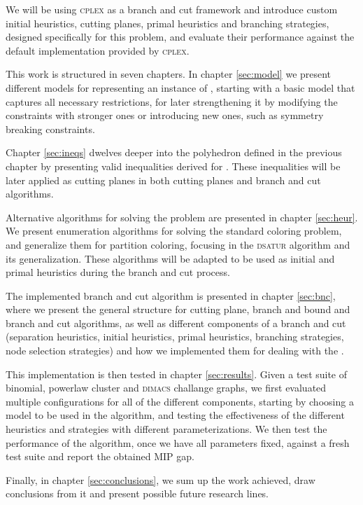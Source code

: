 We will be using \textsc{cplex} as a branch and cut framework and introduce custom initial heuristics, cutting planes, primal heuristics and branching strategies, designed specifically for this problem, and evaluate their performance against the default implementation provided by \textsc{cplex}.

This work is structured in seven chapters. In chapter \ref{sec:model} we present different models for representing an instance of \PCP{}, starting with a basic model that captures all necessary restrictions, for later strengthening it by modifying the constraints with stronger ones or introducing new ones, such as symmetry breaking constraints.

Chapter \ref{sec:ineqs} dwelves deeper into the polyhedron defined in the previous chapter by presenting valid inequalities derived for \PCP{}. These inequalities will be later applied as cutting planes in both cutting planes and branch and cut algorithms.

Alternative algorithms for solving the problem are presented in chapter \ref{sec:heur}. We present enumeration algorithms for solving the standard coloring problem, and generalize them for partition coloring, focusing in the \textsc{dsatur} algorithm \cite{brelaz1979new} and its generalization. These algorithms will be adapted to be used as initial and primal heuristics during the branch and cut process.

The implemented branch and cut algorithm is presented in chapter \ref{sec:bnc}, where we present the general structure for cutting plane, branch and bound and branch and cut algorithms, as well as different components of a branch and cut (separation heuristics, initial heuristics, primal heuristics, branching strategies, node selection strategies) and how we implemented them for dealing with the \PCP{}.

This implementation is then tested in chapter \ref{sec:results}. Given a test suite of binomial, powerlaw cluster and \textsc{dimacs} challange graphs, we first evaluated multiple configurations for all of the different components, starting by choosing a model to be used in the algorithm, and testing the effectiveness of the different heuristics and strategies with different parameterizations. We then test the performance of the algorithm, once we have all parameters fixed, against a fresh test suite and report the obtained MIP gap.

Finally, in chapter \ref{sec:conclusions}, we sum up the work achieved, draw conclusions from it and present possible future research lines.

